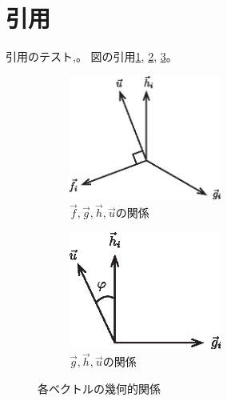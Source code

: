 \documentclass[a4paper,uplatex,dvipdfmx,ja=standard,11pt]{bxjsarticle}
\begin{document}
	\section{引用}
	引用のテスト\cite{Stevenson2012,Tsukahara2016},\cite{konoue2005,Wie2008,Isabelle,book,inproceeding,URL,URL2}。
	図の引用\ref{fig:fig1}, \ref{fig:fig2}, \ref{fig:case4}。
\begin{figure}[h]
	\begin{subfigure}{0.49\linewidth}
		\centering\includegraphics[width=5cm]{fig/fig1.eps}
		\caption{$\vec{f},\vec{g},\vec{h},\vec{u}$の関係}\label{fig:fig1}    %
	\end{subfigure}
	\begin{subfigure}{0.49\linewidth}
		\centering\includegraphics[width=5cm]{fig/fig2.eps}
		\caption{$\vec{g},\vec{h},\vec{u}$の関係}\label{fig:fig2}    %
	\end{subfigure}
	\caption{各ベクトルの幾何的関係}\label{fig:case4} 
\end{figure}


\end{document}
